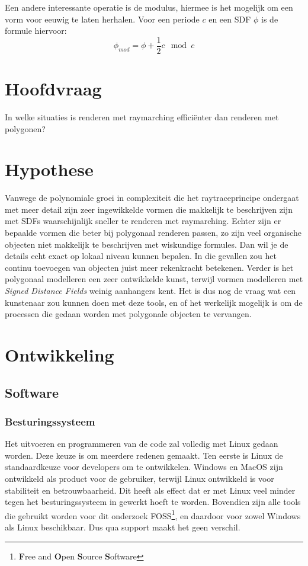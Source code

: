 \documentclass[12pt, a4paper]{article}
\begin{document}
Een andere interessante operatie is de modulus, hiermee is het mogelijk om een vorm voor eeuwig te laten herhalen. Voor een periode $c$ en een SDF $\phi$ is de formule hiervoor:
\[\phi_{mod}= \phi +\frac{1}{2}c\mod{c}\]

\clearpage
\section{Hoofdvraag}
\Large In welke situaties is renderen met raymarching efficiënter dan renderen met polygonen? \normalsize
\section{Hypothese}
Vanwege de polynomiale groei in complexiteit die het raytraceprincipe ondergaat met meer detail zijn zeer ingewikkelde vormen die makkelijk te beschrijven zijn met SDFs waarschijnlijk sneller te renderen met raymarching. Echter zijn er bepaalde vormen die beter bij polygonaal renderen passen, zo zijn veel organische objecten niet makkelijk te beschrijven met wiskundige formules. Dan wil je de details echt exact op lokaal niveau kunnen bepalen. In die gevallen zou het continu toevoegen van objecten juist meer rekenkracht betekenen. Verder is het polygonaal modelleren een zeer ontwikkelde kunst, terwijl vormen modelleren met \emph{Signed Distance Fields} weinig aanhangers kent. Het is dus nog de vraag wat een kunstenaar zou kunnen doen met deze tools, en of het werkelijk mogelijk is om de processen die gedaan worden met polygonale objecten te vervangen.
\clearpage
\section{Ontwikkeling}
\subsection{Software}
\subsubsection{Besturingssysteem}
Het uitvoeren en programmeren van de code zal volledig met Linux gedaan worden. Deze keuze is om meerdere redenen gemaakt. Ten eerste is Linux de standaardkeuze voor developers om te ontwikkelen. Windows en MacOS zijn ontwikkeld als product voor de gebruiker, terwijl Linux ontwikkeld is voor stabiliteit en betrouwbaarheid. Dit heeft als effect dat er met Linux veel minder tegen het besturingssysteem in gewerkt hoeft te worden. Bovendien zijn alle tools die gebruikt worden voor dit onderzoek FOSS\footnote{\textbf{F}ree and \textbf{O}pen \textbf{S}ource \textbf{S}oftware}, en daardoor voor zowel Windows als Linux beschikbaar. Dus qua support maakt het geen verschil.
\end{document}
